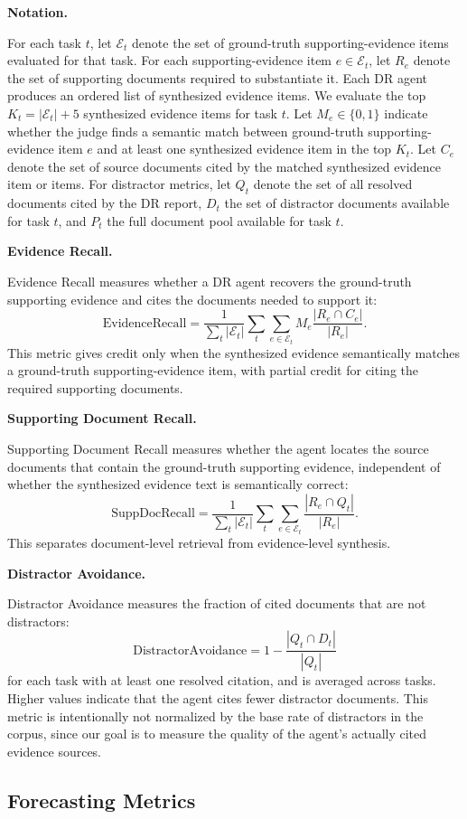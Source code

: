 \documentclass[]{servicenow}
\newcommand{\paragraphtight}[1]{%
  \par\vspace{-0.75\parskip}\vspace{0.3em}%
  \noindent\textbf{#1}\hspace{0.4em}\ignorespaces
}
\begin{document}
\paragraphtight{Notation.}
For each task $t$, let $\mathcal{E}_t$ denote the set of ground-truth supporting-evidence items evaluated for that task.
For each supporting-evidence item $e \in \mathcal{E}_t$, let $R_e$ denote the set of supporting documents required to substantiate it.
Each DR agent produces an ordered list of synthesized evidence items.
We evaluate the top $K_t = |\mathcal{E}_t| + 5$ synthesized evidence items for task $t$.
Let $M_e \in \{0,1\}$ indicate whether the judge finds a semantic match between ground-truth supporting-evidence item $e$ and at least one synthesized evidence item in the top $K_t$.
Let $C_e$ denote the set of source documents cited by the matched synthesized evidence item or items.
For distractor metrics, let $Q_t$ denote the set of all resolved documents cited by the DR report, $D_t$ the set of distractor documents available for task $t$, and $P_t$ the full document pool available for task $t$.

\paragraphtight{Evidence Recall.}
Evidence Recall measures whether a DR agent recovers the ground-truth supporting evidence and cites the documents needed to support it:
\[
\mathrm{EvidenceRecall}
= \frac{1}{\sum_t |\mathcal{E}_t|}
  \sum_t \sum_{e \in \mathcal{E}_t}
  M_e
  \frac{|R_e \cap C_e|}{|R_e|}.
\]
This metric gives credit only when the synthesized evidence semantically matches a ground-truth supporting-evidence item, with partial credit for citing the required supporting documents.

\paragraphtight{Supporting Document Recall.}
Supporting Document Recall measures whether the agent locates the source documents that contain the ground-truth supporting evidence, independent of whether the synthesized evidence text is semantically correct:
\[
\mathrm{SuppDocRecall}
= \frac{1}{\sum_t |\mathcal{E}_t|}
  \sum_t \sum_{e \in \mathcal{E}_t}
  \frac{|R_e \cap Q_t|}{|R_e|}.
\]
This separates document-level retrieval from evidence-level synthesis.

\paragraphtight{Distractor Avoidance.}
Distractor Avoidance measures the fraction of cited documents that are not distractors:
\[
\mathrm{DistractorAvoidance}
= 1 -
\frac{|Q_t \cap D_t|}{|Q_t|}
\]
for each task with at least one resolved citation, and is averaged across tasks.
Higher values indicate that the agent cites fewer distractor documents.
This metric is intentionally not normalized by the base rate of distractors in the corpus, since our goal is to measure the quality of the agent's actually cited evidence sources.


\subsection{Forecasting Metrics}
\label{app:metrics-forecast}
\end{document}
